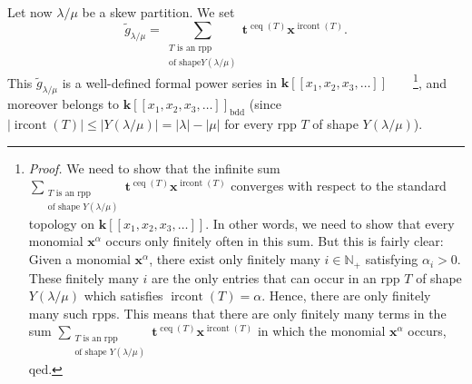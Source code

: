 \documentclass[numbers=enddot,12pt,final,onecolumn,notitlepage]{scrartcl}%
\theoremstyle{definition}
\newenvironment{vershort}{}{}
\let\sumnonlimits\sum
\renewcommand{\sum}{\sumnonlimits\limits}
\begin{document}
\begin{vershort}
Let now $\lambda/\mu$ be a skew partition. We set%
\[
\widetilde{g}_{\lambda/\mu}=\sum_{\substack{T\text{ is an rpp}\\\text{of shape
}Y\left(  \lambda/\mu\right)  }}\mathbf{t}^{\operatorname*{ceq}\left(
T\right)  }\mathbf{x}^{\operatorname*{ircont}\left(  T\right)  }.
\]
This $\widetilde{g}_{\lambda/\mu}$ is a well-defined formal power series in
$\mathbf{k}\left[  \left[  x_{1},x_{2},x_{3},\ldots\right]  \right]
$\ \ \ \ \footnote{\textit{Proof.} We need to show that the infinite sum
$\sum_{\substack{T\text{ is an rpp}\\\text{of shape }Y\left(  \lambda
/\mu\right)  }}\mathbf{t}^{\operatorname*{ceq}\left(  T\right)  }%
\mathbf{x}^{\operatorname*{ircont}\left(  T\right)  }$ converges with respect
to the standard topology on $\mathbf{k}\left[  \left[  x_{1},x_{2}%
,x_{3},\ldots\right]  \right]  $. In other words, we need to show that every
monomial $\mathbf{x}^{\alpha}$ occurs only finitely often in this sum. But
this is fairly clear: Given a monomial $\mathbf{x}^{\alpha}$, there exist only
finitely many $i\in\mathbb{N}_{+}$ satisfying $\alpha_{i}>0$. These finitely
many $i$ are the only entries that can occur in an rpp $T$ of shape $Y\left(
\lambda/\mu\right)  $ which satisfies $\operatorname*{ircont}\left(  T\right)
=\alpha$. Hence, there are only finitely many such rpps. This means that there
are only finitely many terms in the sum $\sum_{\substack{T\text{ is an
rpp}\\\text{of shape }Y\left(  \lambda/\mu\right)  }}\mathbf{t}%
^{\operatorname*{ceq}\left(  T\right)  }\mathbf{x}^{\operatorname*{ircont}%
\left(  T\right)  }$ in which the monomial $\mathbf{x}^{\alpha}$ occurs,
qed.}, and moreover belongs to $\mathbf{k}\left[  \left[  x_{1},x_{2}%
,x_{3},\ldots\right]  \right]  _{\operatorname*{bdd}}$ (since $\left\vert
\operatorname*{ircont}\left(  T\right)  \right\vert \leq\left\vert Y\left(
\lambda/\mu\right)  \right\vert =\left\vert \lambda\right\vert -\left\vert
\mu\right\vert $ for every rpp $T$ of shape $Y\left(  \lambda/\mu\right)  $).
\end{vershort}
\end{document}
